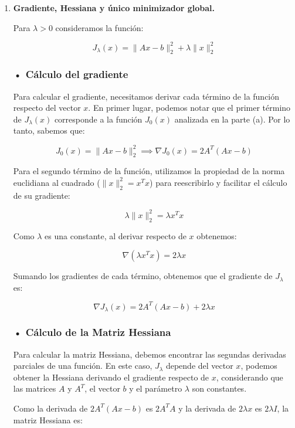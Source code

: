 \documentclass{article}
\begin{document}
\begin{enumerate}[label=\roman*., widest=iv]

  \item \textbf{Gradiente, Hessiana y único minimizador global.}

  Para \(\lambda > 0\) consideramos la función:

  \[
  J_\lambda(x)=\|Ax-b\|_2^2+\lambda\|x\|_2^2
  \]

  \subsubsection*{• Cálculo del gradiente}

  Para calcular el gradiente, necesitamos derivar cada término de la función respecto del vector \(x\). En primer lugar, podemos notar que el primer término de \(J_\lambda(x)\) corresponde a la función \(J_0(x)\) analizada en la parte (a). Por lo tanto, sabemos que:

  \[
  J_0(x)=\|Ax-b\|_2^2
  \implies
  \nabla J_0(x)=2A^T(Ax-b)
  \]

  Para el segundo término de la función, utilizamos la propiedad de la norma euclidiana al cuadrado (\(\|x\|_2^2=x^Tx\)) para reescribirlo y facilitar el cálculo de su gradiente:

  \[
  \lambda\|x\|_2^2=\lambda x^Tx
  \]

  Como \(\lambda\) es una constante, al derivar respecto de \(x\) obtenemos:

  \[
  \nabla(\lambda x^Tx)=2\lambda x
  \]

  Sumando los gradientes de cada término, obtenemos que el gradiente de \(J_\lambda\) es:

  \[
  \boxed{\nabla J_\lambda(x)=2A^T(Ax-b)+2\lambda x}
  \]

  \subsubsection*{• Cálculo de la Matriz Hessiana}

  Para calcular la matriz Hessiana, debemos encontrar las segundas derivadas parciales de una función. En este caso, \(J_\lambda\) depende del vector \(x\), podemos obtener la Hessiana derivando el gradiente respecto de \(x\), considerando que las matrices \(A\) y \(A^T\), el vector \(b\) y el parámetro \(\lambda\) son constantes.

  Como la derivada de \(2A^T(Ax-b)\) es \(2A^TA\) y la derivada de \(2\lambda x\) es \(2\lambda I\), la matriz Hessiana es:


\end{enumerate}
\end{document}

